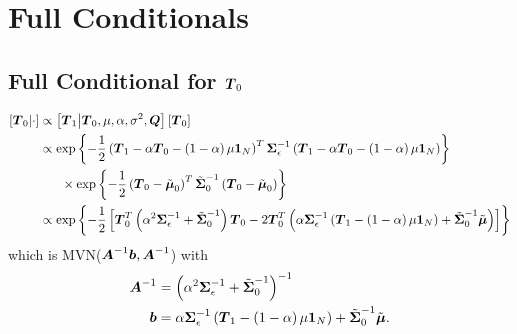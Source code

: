 \documentclass{article}\usepackage[]{graphicx}\usepackage[]{color}
\def\bm#1{\mbox{\boldmath $#1$}}
\begin{document}
\section{Full Conditionals}
%
%
\subsection{Full Conditional for $\bm{T}_0$}
%
\begin{align*}
%
\left[ \bm{T}_0 \middle| \cdot \right] & \propto \left[ \bm{T}_1 \middle| \bm{T}_0, \mu, \alpha, \sigma^2, \bm{Q} \right] \left[ \bm{T}_0 \right] \\
%
& \propto \exp{ \left\{ - \frac{1} {2} \left( \bm{T}_1 - \alpha \bm{T}_0 - \left( 1 - \alpha \right) \mu \bm{1}_N \right)^T \bm{\Sigma}_\epsilon^{ - 1} \left( \bm{T}_1 - \alpha \bm{T}_0 - \left( 1 - \alpha \right) \mu \bm{1}_N \right) \right\} }\\
& \hspace{6mm} \times \exp{ \left\{ - \frac{1} {2} \left( \bm{T}_0 - \tilde{\bm{\mu}}_0 \right)^T \tilde{\bm{\Sigma}}_0^{ - 1} \left( \bm{T}_0 - \tilde{\bm{\mu}}_0 \right) \right\} }\\
%
& \propto \exp{ \left\{ - \frac{1} {2} \left[ \bm{T}_0^T \left( \alpha^2 \bm{\Sigma}_\epsilon^{ - 1} + \tilde{\bm{\Sigma}}_0^{ - 1} \right) \bm{T}_0 - 2 \bm{T}_0^T \left( \alpha \bm{\Sigma}_\epsilon^{ - 1} \left( \bm{T}_1 - \left( 1 - \alpha \right) \mu \bm{1}_N \right) + \tilde{\bm{\Sigma}}_0^{ - 1} \tilde{\bm{\mu}} \right) \right]\right\} }
%
\end{align*}
% 
which is MVN($\bm{A}^{ - 1}\bm{b}, \bm{A}^{ - 1}$) with \\
%
\begin{align*}
%
\bm{A}^{ - 1} & = \left( \alpha^2 \bm{\Sigma}_\epsilon^{ - 1} + \tilde{\bm{\Sigma}}_0^{ - 1} \right)^{ - 1}\\
%
\bm{b} & = \alpha \bm{\Sigma}_\epsilon^{ - 1} \left( \bm{T}_1 - \left( 1 - \alpha \right) \mu \bm{1}_N \right) + \tilde{\bm{\Sigma}}_0^{ - 1} \tilde{\bm{\mu}}.
%
\end{align*}
%
\end{document}
